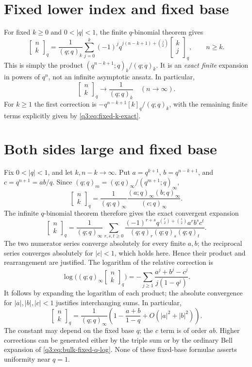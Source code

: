 \documentclass[11pt,a4paper,oneside,openany]{book}
\theoremstyle{definition}
\theoremstyle{remark}
\newcommand{\GB}[3][q]{\begin{bmatrix}#2\\#3\end{bmatrix}_{#1}}
\newcommand{\G}[2]{\GB{#1}{#2}}
\begin{document}
\section{Fixed lower index and fixed base}
For fixed $k\ge0$ and $0<|q|<1$, the finite $q$-binomial theorem gives
\begin{equation}
 \boxed{\displaystyle
 \G nk=\frac1{(q;q)_k}
      \sum_{j=0}^k(-1)^jq^{j(n-k+1)+\binom j2}\G kj,
       \qquad n\ge k.}
 \label{q3:eq:fixed-k-exact}
\end{equation}
This is simply the product
$(q^{n-k+1};q)_k/(q;q)_k$. It is an \emph{exact finite} expansion in
powers of $q^n$, not an infinite asymptotic ansatz. In particular,
\[
 \G nk\longrightarrow\frac1{(q;q)_k}\quad(n\to\infty).
\]
For $k\ge1$ the first correction is
$-q^{n-k+1}[k]_q/(q;q)_k$, with the remaining finite terms explicitly
given by \cref{q3:eq:fixed-k-exact}.

\section{Both sides large and fixed base}
Fix $0<|q|<1$, and let $k,n-k\to\infty$. Put
$a=q^{k+1}$, $b=q^{n-k+1}$, and $c=q^{n+1}=ab/q$.
Since $(q;q)_m=(q;q)_\infty/(q^{m+1};q)_\infty$,
\begin{equation}
 \G nk=\frac1{(q;q)_\infty}
              \frac{(a;q)_\infty(b;q)_\infty}{(c;q)_\infty}.
 \label{q3:eq:bulk-fixed-q-product}
\end{equation}
The infinite $q$-binomial theorem therefore gives the exact convergent
expansion
\begin{equation}
 \G nk=\frac1{(q;q)_\infty}
 \sum_{r,s,t\ge0}
   \frac{(-1)^{r+s}q^{\binom r2+\binom s2}a^rb^sc^t}
        {(q;q)_r(q;q)_s(q;q)_t}.
 \label{q3:eq:bulk-fixed-q-triple}
\end{equation}
The two numerator series converge absolutely for every finite $a,b$;
the reciprocal series converges absolutely for $|c|<1$, which holds
here. Hence their product and rearrangement are justified.
The logarithm of the relative correction is
\begin{equation}
 \log\bigl((q;q)_\infty\G nk\bigr)
   =-\sum_{j\ge1}\frac{a^j+b^j-c^j}{j(1-q^j)}.
 \label{q3:eq:bulk-fixed-q-log}
\end{equation}
It follows by expanding the logarithm of each product; the absolute
convergence for $|a|,|b|,|c|<1$ justifies interchanging sums. In
particular,
\begin{equation}
 \G nk=\frac1{(q;q)_\infty}
       \left(1-\frac{a+b}{1-q}
                       +O(|a|^2+|b|^2)\right).
 \label{q3:eq:bulk-fixed-q-leading}
\end{equation}
The constant may depend on the fixed base $q$; the $c$ term is of order
$ab$. Higher corrections can be generated either by the triple sum or
by the ordinary Bell expansion of \cref{q3:eq:bulk-fixed-q-log}. None of
these fixed-base formulae asserts uniformity near $q=1$.
\end{document}
